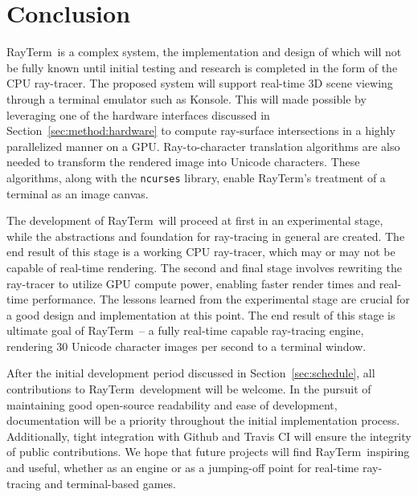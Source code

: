 \documentclass[11pt]{article}
\newcommand{\name}{{\sc RayTerm}}
\begin{document}
\section{Conclusion}
\label{sec:conclusion}


\name\ is a complex system, the implementation and design of which will not be fully known until initial testing and research is completed in the form of the CPU ray-tracer.
The proposed system will support real-time 3D scene viewing through a terminal emulator such as Konsole.
This will made possible by leveraging one of the hardware interfaces discussed in Section~\ref{sec:method:hardware} to compute ray-surface intersections in a highly parallelized manner on a GPU.
Ray-to-character translation algorithms are also needed to transform the rendered image into Unicode characters.
These algorithms, along with the \texttt{ncurses} library, enable \name's treatment of a terminal as an image canvas.

The development of \name\ will proceed at first in an experimental stage, while the abstractions and foundation for ray-tracing in general are created.
The end result of this stage is a working CPU ray-tracer, which may or may not be capable of real-time rendering.
The second and final stage involves rewriting the ray-tracer to utilize GPU compute power, enabling faster render times and real-time performance.
The lessons learned from the experimental stage are crucial for a good design and implementation at this point.
The end result of this stage is ultimate goal of \name\ -- a fully real-time capable ray-tracing engine, rendering 30 Unicode character images per second to a terminal window.

After the initial development period discussed in Section~\ref{sec:schedule}, all contributions to \name\ development will be welcome.
In the pursuit of maintaining good open-source readability and ease of development, documentation will be a priority throughout the initial implementation process.
Additionally, tight integration with Github and Travis CI will ensure the integrity of public contributions.
We hope that future projects will find \name\ inspiring and useful, whether as an engine or as a jumping-off point for real-time ray-tracing and terminal-based games.




\end{document}
